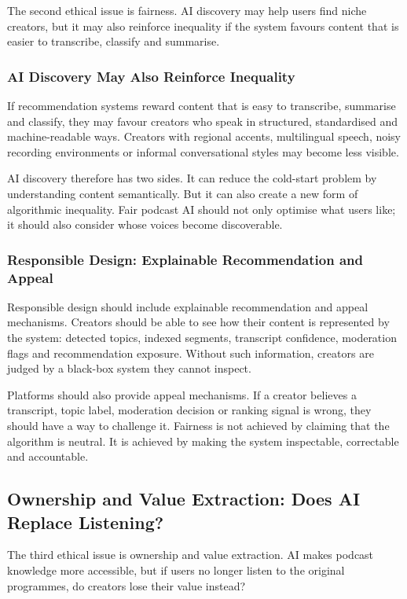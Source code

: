 \documentclass[11pt,a4paper]{article}
\begin{document}
The second ethical issue is fairness. AI discovery may help users find niche creators, but it may also reinforce inequality if the system favours content that is easier to transcribe, classify and summarise.

\subsubsection{AI Discovery May Also Reinforce Inequality}

If recommendation systems reward content that is easy to transcribe, summarise and classify, they may favour creators who speak in structured, standardised and machine-readable ways. Creators with regional accents, multilingual speech, noisy recording environments or informal conversational styles may become less visible.

AI discovery therefore has two sides. It can reduce the cold-start problem by understanding content semantically. But it can also create a new form of algorithmic inequality. Fair podcast AI should not only optimise what users like; it should also consider whose voices become discoverable.

\subsubsection{Responsible Design: Explainable Recommendation and Appeal}

Responsible design should include explainable recommendation and appeal mechanisms. Creators should be able to see how their content is represented by the system: detected topics, indexed segments, transcript confidence, moderation flags and recommendation exposure. Without such information, creators are judged by a black-box system they cannot inspect.

Platforms should also provide appeal mechanisms. If a creator believes a transcript, topic label, moderation decision or ranking signal is wrong, they should have a way to challenge it. Fairness is not achieved by claiming that the algorithm is neutral. It is achieved by making the system inspectable, correctable and accountable.

\subsection{Ownership and Value Extraction: Does AI Replace Listening?}

The third ethical issue is ownership and value extraction. AI makes podcast knowledge more accessible, but if users no longer listen to the original programmes, do creators lose their value instead?
\end{document}
